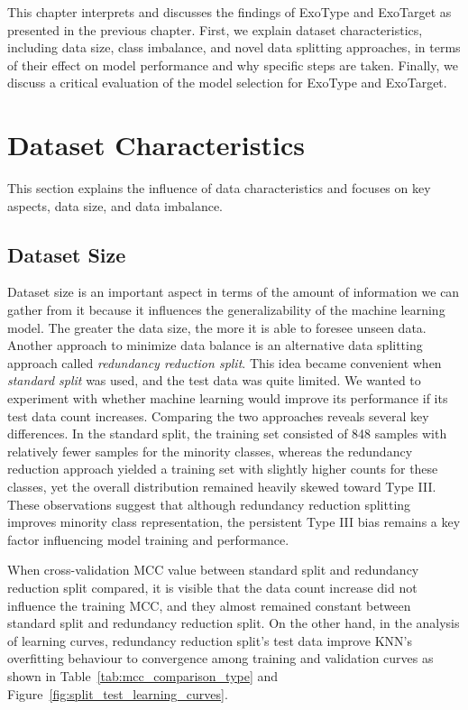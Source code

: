 This chapter interprets and discusses the findings of ExoType and ExoTarget as presented in the previous chapter. First, we explain dataset characteristics, including data size, class imbalance, and novel data splitting approaches, in terms of their effect on model performance and why specific steps are taken. Finally, we discuss a critical evaluation of the model selection for ExoType and ExoTarget.

\section{Dataset Characteristics}
This section explains the influence of data characteristics and focuses on key aspects, data size, and data imbalance.

\subsection{Dataset Size}
Dataset size is an important aspect in terms of the amount of information we can gather from it because it influences the generalizability of the machine learning model. The greater the data size, the more it is able to foresee unseen data. 
Another approach to minimize data balance is an alternative data splitting approach called \textit{redundancy reduction split}. This idea became convenient when \textit{standard split} was used, and the test data was quite limited. We wanted to experiment with whether machine learning would improve its performance if its test data count increases. Comparing the two approaches reveals several key differences. In the standard split, the training set consisted of 848 samples with relatively fewer samples for the minority classes, whereas the redundancy reduction approach yielded a training set with slightly higher counts for these classes, yet the overall distribution remained heavily skewed toward Type III. 
These observations suggest that although redundancy reduction splitting improves minority class representation, the persistent Type III bias remains a key factor influencing model training and performance.

When cross-validation \gls{MCC} value between standard split and redundancy reduction split compared, it is visible that the data count increase did not influence the training \gls{MCC}, and they almost remained constant between standard split and redundancy reduction split. On the other hand, in the analysis of learning curves, redundancy reduction split's test data improve KNN's overfitting behaviour to convergence among training and validation curves as shown in Table~\ref{tab:mcc_comparison_type}  and Figure~\ref{fig:split_test_learning_curves}.

